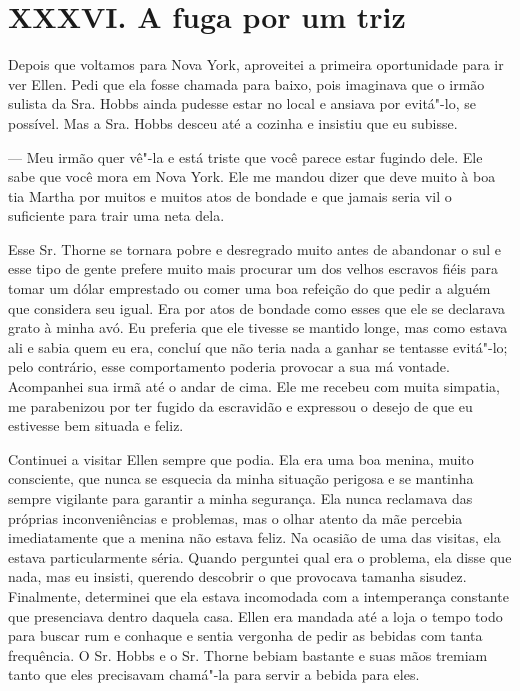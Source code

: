 \chapter{XXXVI. A fuga por um triz}

Depois que voltamos para Nova York,
aproveitei a primeira oportunidade para ir ver Ellen. Pedi que ela fosse
chamada para baixo, pois imaginava que o irmão sulista da Sra. Hobbs
ainda pudesse estar no local e ansiava por evitá"-lo, se possível. Mas a
Sra. Hobbs desceu até a cozinha e insistiu que eu subisse.

--- Meu irmão quer vê"-la e está triste que você parece estar fugindo
dele. Ele sabe que você mora em Nova York. Ele me mandou dizer que deve
muito à boa tia Martha por muitos e muitos atos de bondade e que jamais
seria vil o suficiente para trair uma neta dela.

Esse Sr. Thorne se tornara pobre e
desregrado muito antes de abandonar o sul e esse tipo de gente prefere
muito mais procurar um dos velhos escravos fiéis para tomar um dólar
emprestado ou comer uma boa refeição do que pedir a alguém que considera
seu igual. Era por atos de bondade como esses que ele se declarava grato
à minha avó. Eu preferia que ele tivesse se mantido longe, mas como
estava ali e sabia quem eu era, concluí que não teria nada a ganhar se
tentasse evitá"-lo; pelo contrário, esse comportamento poderia provocar a
sua má vontade. Acompanhei sua irmã até o andar de cima. Ele me recebeu
com muita simpatia, me parabenizou por ter fugido da escravidão e
expressou o desejo de que eu estivesse bem situada e feliz.

Continuei a visitar Ellen sempre que
podia. Ela era uma boa menina, muito consciente, que nunca se esquecia
da minha situação perigosa e se mantinha sempre vigilante para garantir
a minha segurança. Ela nunca reclamava das próprias inconveniências e
problemas, mas o olhar atento da mãe percebia imediatamente que a menina
não estava feliz. Na ocasião de uma das visitas, ela estava
particularmente séria. Quando perguntei qual era o problema, ela disse
que nada, mas eu insisti, querendo descobrir o que provocava tamanha
sisudez. Finalmente, determinei que ela estava incomodada com a
intemperança constante que presenciava dentro daquela casa. Ellen era
mandada até a loja o tempo todo para buscar rum e conhaque e sentia
vergonha de pedir as bebidas com tanta frequência. O Sr. Hobbs e o Sr.
Thorne bebiam bastante e suas mãos tremiam tanto que eles precisavam
chamá"-la para servir a bebida para eles.

